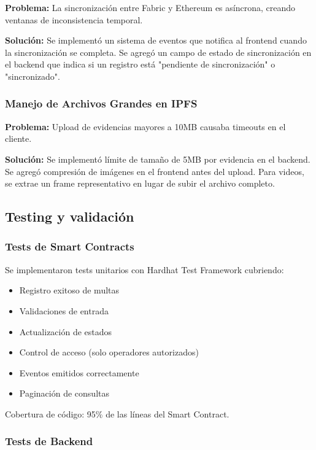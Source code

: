 \textbf{Problema:} La sincronización entre Fabric y Ethereum es asíncrona, creando ventanas de inconsistencia temporal.

\textbf{Solución:} Se implementó un sistema de eventos que notifica al frontend cuando la sincronización se completa. Se agregó un campo de estado de sincronización en el backend que indica si un registro está "pendiente de sincronización" o "sincronizado".

\subsubsection{Manejo de Archivos Grandes en IPFS}

\textbf{Problema:} Upload de evidencias mayores a 10MB causaba timeouts en el cliente.

\textbf{Solución:} Se implementó límite de tamaño de 5MB por evidencia en el backend. Se agregó compresión de imágenes en el frontend antes del upload. Para videos, se extrae un frame representativo en lugar de subir el archivo completo.

\subsection{Testing y validación}

\subsubsection{Tests de Smart Contracts}

Se implementaron tests unitarios con Hardhat Test Framework cubriendo:
\begin{itemize}
    \item Registro exitoso de multas
    \item Validaciones de entrada
    \item Actualización de estados
    \item Control de acceso (solo operadores autorizados)
    \item Eventos emitidos correctamente
    \item Paginación de consultas
\end{itemize}

Cobertura de código: 95\% de las líneas del Smart Contract.

\subsubsection{Tests de Backend}

